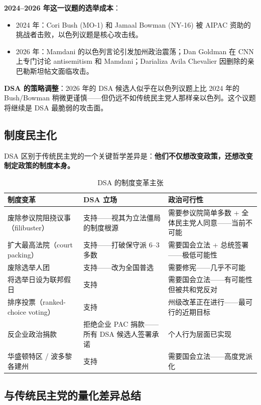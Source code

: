 \documentclass[12pt,a4paper]{ctexart}
\begin{document}
\textbf{2024--2026 年这一议题的选举成本}：

\begin{itemize}
  \item 2024 年：Cori Bush (MO-1) 和 Jamaal Bowman (NY-16) 被 AIPAC 资助的挑战者击败，以色列议题是核心攻击线。
  \item 2026 年：Mamdani 的以色列言论引发加州政治震荡；Dan Goldman 在 CNN 上专门讨论 antisemitism 和 Mamdani；Darializa Avila Chevalier 因删除的亲巴勒斯坦帖文面临攻击。
\end{itemize}

\textbf{DSA 的策略调整}：2026 年的 DSA 候选人似乎在以色列议题上比 2024 年的 Bush/Bowman 稍微更谨慎——但仍远不如传统民主党人那样亲以色列。这个议题将继续是 DSA 最脆弱的攻击面。

\subsection{制度民主化}

DSA 区别于传统民主党的一个关键哲学差异是：\textbf{他们不仅想改变政策，还想改变制定政策的制度本身。}

\begin{table}[h]
\centering
\caption{DSA 的制度变革主张}
\begin{tabular}{@{}lp{6.4cm}p{6.4cm}@{}}
\toprule
\textbf{制度变革} & \textbf{DSA 立场} & \textbf{政治可行性} \\
\midrule
废除参议院阻挠议事（filibuster） & 支持——视其为立法僵局的制度根源 & 需要参议院简单多数 + 全体民主党人同意——当前不可能 \\
扩大最高法院（court packing） & 支持——打破保守派 6--3 多数 & 需要国会立法 + 总统签署——极低可能性 \\
废除选举人团 & 支持——改为全国普选 & 需要修宪——几乎不可能 \\
将选举日设为联邦假日 & 支持 & 需要国会立法——有可能性但被共和党反对 \\
排序投票（ranked-choice voting） & 支持 & 州级改革正在进行——最可行的近期目标 \\
反企业政治捐款 & 拒绝企业 PAC 捐款——所有 DSA 候选人签署承诺 & 个人行为层面已实现 \\
华盛顿特区 / 波多黎各建州 & 支持 & 需要国会立法——高度党派化 \\
\bottomrule
\end{tabular}
\end{table}

\subsection{与传统民主党的量化差异总结}
\end{document}
